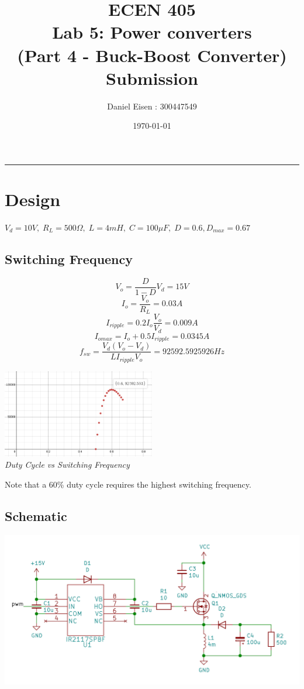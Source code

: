 \documentclass[11pt]{article}
\title{ECEN 405 \\ Lab 5: Power converters \\ (Part 4 - Buck-Boost Converter) Submission}
\author{Daniel Eisen : 300447549}
\date{\today}
\begin{document}
\begin{preview}

    \maketitle
    \hrule
    \section{Design}
    $V_d=10V,\; R_L=500\Omega,\; L=4mH,\; C=100\mu F,\; D=0.6, D_{max} = 0.67$
        \subsection*{Switching Frequency}
            $$V_{o}=\frac{D}{1-D}V_{d}=15V$$
            $$I_{o}=\frac{V_{o}}{R_{L}}=0.03A$$
            $$I_{ripple}=0.2I_{o}\frac{V_{o}}{V_{d}}=0.009A$$
            $$I_{omax}=I_{o}+0.5I_{ripple}=0.0345A$$
            $$f_{sw}=\frac{V_{d}\left(V_{o}-V_{d}\right)}{LI_{ripple}V_{o}} = 92592.5925926Hz$$
            \begin{center}
                \includegraphics[width=0.5\textwidth]{img/fw_d.png}\\
                \textit{Duty Cycle vs Switching Frequency}
            \end{center}
            Note that a 60\% duty cycle requires the highest switching frequency.
        \subsection*{Schematic}
        \begin{center}
            \includegraphics[width=\textwidth]{img/schem.png}
        \end{center}

\end{preview}
\end{document}
